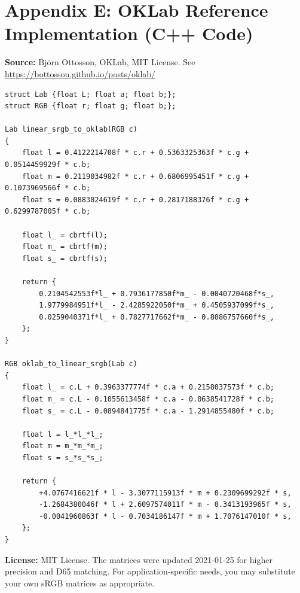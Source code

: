 
\section*{Appendix E: OKLab Reference Implementation (C++ Code)}
\label{app:oklab-code}

\textbf{Source:} Björn Ottosson, OKLab, MIT License. See \url{https://bottosson.github.io/posts/oklab/}

\begin{verbatim}
struct Lab {float L; float a; float b;};
struct RGB {float r; float g; float b;};

Lab linear_srgb_to_oklab(RGB c) 
{
    float l = 0.4122214708f * c.r + 0.5363325363f * c.g + 0.0514459929f * c.b;
    float m = 0.2119034982f * c.r + 0.6806995451f * c.g + 0.1073969566f * c.b;
    float s = 0.0883024619f * c.r + 0.2817188376f * c.g + 0.6299787005f * c.b;

    float l_ = cbrtf(l);
    float m_ = cbrtf(m);
    float s_ = cbrtf(s);

    return {
        0.2104542553f*l_ + 0.7936177850f*m_ - 0.0040720468f*s_,
        1.9779984951f*l_ - 2.4285922050f*m_ + 0.4505937099f*s_,
        0.0259040371f*l_ + 0.7827717662f*m_ - 0.8086757660f*s_,
    };
}

RGB oklab_to_linear_srgb(Lab c) 
{
    float l_ = c.L + 0.3963377774f * c.a + 0.2158037573f * c.b;
    float m_ = c.L - 0.1055613458f * c.a - 0.0638541728f * c.b;
    float s_ = c.L - 0.0894841775f * c.a - 1.2914855480f * c.b;

    float l = l_*l_*l_;
    float m = m_*m_*m_;
    float s = s_*s_*s_;

    return {
        +4.0767416621f * l - 3.3077115913f * m + 0.2309699292f * s,
        -1.2684380046f * l + 2.6097574011f * m - 0.3413193965f * s,
        -0.0041960863f * l - 0.7034186147f * m + 1.7076147010f * s,
    };
}
\end{verbatim}

\textbf{License:} MIT License. The matrices were updated 2021-01-25 for higher precision and D65 matching. For application-specific needs, you may substitute your own sRGB matrices as appropriate.
